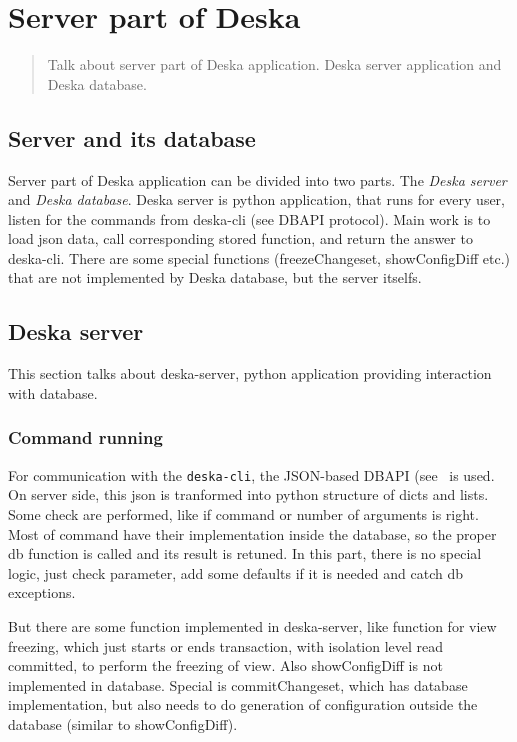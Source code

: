 \documentclass[deska]{subfiles}
\begin{document}
\chapter{Server part of Deska}
\label{sec:deska-server}

\begin{abstract}
Talk about server part of Deska application. Deska server application and Deska database.
\end{abstract}

\section{Server and its database}
Server part of Deska application can be divided into two parts. The {\em Deska server} and {\em Deska database}.
Deska server is python application, that runs for every user, listen for the commands from deska-cli (see DBAPI protocol).
Main work is to load json data, call corresponding stored function, and return the answer to deska-cli.
There are some special functions (freezeChangeset, showConfigDiff etc.) that are not implemented by Deska database, but the server itselfs.

\section{Deska server}
\label{sec:server-py}

This section talks about deska-server, python application providing interaction with database.


\subsection{Command running}
For communication with the {\tt deska-cli}, the JSON-based DBAPI (see~ is used. On server side, this json is tranformed into python structure of dicts and lists. Some check are performed, like if command or number of arguments is right.
Most of command have their implementation inside the database, so the proper db function is called and its result is retuned. In this part, there is no special logic, just check parameter, add some defaults if it is needed and catch db exceptions.

But there are some function implemented in deska-server, like function for view freezing, which just starts or ends transaction, with isolation
level read committed, to perform the freezing of view.
Also showConfigDiff is not implemented in database. Special is commitChangeset, which has database implementation, but also needs to do generation of configuration outside the database (similar to showConfigDiff).
\end{document}
